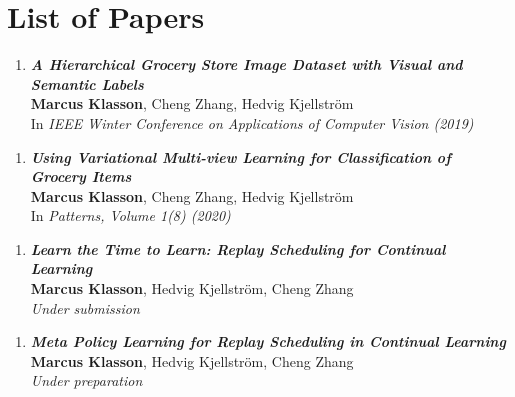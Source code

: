 
\chapter{List of Papers}
\label{chap:list_of_papers}

\begin{enumerate}[A]
	\item \textbf{\textit{A Hierarchical Grocery Store Image Dataset with Visual and Semantic Labels}} \\
	\textbf{Marcus Klasson}, Cheng Zhang, Hedvig Kjellström \\
	In \textit{IEEE Winter Conference on Applications of Computer Vision (2019)}
\end{enumerate}

\begin{enumerate}[B]
	\item \textbf{\textit{Using Variational Multi-view Learning for Classification of Grocery Items}} \\
	\textbf{Marcus Klasson}, Cheng Zhang, Hedvig Kjellström \\
	In \textit{Patterns, Volume 1(8) (2020)}
\end{enumerate}

\begin{enumerate}[C]
	\item \textbf{\textit{Learn the Time to Learn: Replay Scheduling for Continual Learning}} \\
	\textbf{Marcus Klasson}, Hedvig Kjellström, Cheng Zhang \\
	\textit{Under submission}
\end{enumerate}

\begin{enumerate}[D]
	\item \textbf{\textit{Meta Policy Learning for Replay Scheduling in Continual Learning}} \\
	\textbf{Marcus Klasson}, Hedvig Kjellström, Cheng Zhang \\
	\textit{Under preparation}
\end{enumerate}



\begin{comment}
Other contributions by the author not included in the thesis.
\begin{enumerate}[I]
	\setcounter{enumi}{1}
	\item \textbf{\textit{Title of paper}} \\
	\textbf{First author}, Second author \\
	\textit{Journal (year)}
\end{enumerate}
\end{comment}
